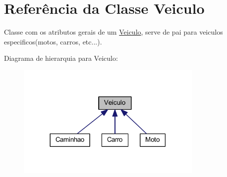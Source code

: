 \hypertarget{class_veiculo}{}\section{Referência da Classe Veiculo}
\label{class_veiculo}


Classe com os atributos gerais de um \mbox{\hyperlink{class_veiculo}{Veiculo}}, serve de pai para veiculos especificos(motos, carros, etc...).  




Diagrama de hierarquia para Veiculo\+:
\nopagebreak
\begin{figure}[H]
\begin{center}
\leavevmode
\includegraphics[width=254pt]{class_veiculo__inherit__graph}
\end{center}
\end{figure}
